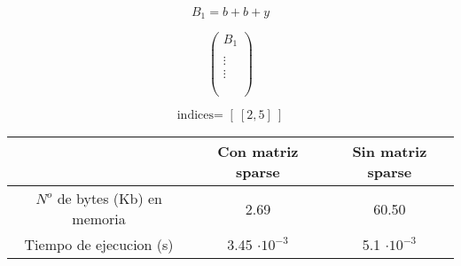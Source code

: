 \documentclass{article}
\begin{document}
\begin{equation}
	B_1 = b +b +y
\end{equation}

\begin{equation}
\begin{pmatrix} 
B_1\\
\\
\vdots\\
\vdots\\
\\
\\

\end{pmatrix}
\end{equation}

\begin{equation}
\textrm{indices= }	[\ \left[2,5\right] \ ]
\end{equation}
\hfill
\begin{tabular}{|c|c|c|}
\hline
\multicolumn{1}{|c|}{} & Con matriz sparse & Sin matriz sparse \\
\hline
$N^{o}$ de bytes (Kb) en memoria & 2.69  & 60.50  \\
\hline
Tiempo de ejecucion (s) & 3.45  $\cdot10^{-3} $   & 5.1 $\cdot10^{-3} $ \\
\hline
\end{tabular}%
\end{document}
